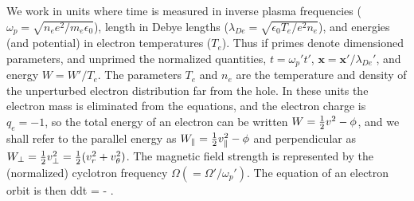 \documentclass{agujournal2019}
\let\oldequation\equation
\let\oldendequation\endequation
\renewenvironment{equation}
  {\linenomathNonumbers\oldequation}
  {\oldendequation\endlinenomath}
\begin{document}
We work in units where time is measured in inverse plasma frequencies
($\omega_p=\sqrt{n_ee^2/m_e\epsilon_0}$), length in Debye lengths
($\lambda_{De}=\sqrt{\epsilon_0T_e/e^2n_e}$), and energies (and
potential) in electron temperatures ($T_e$). Thus if primes denote
dimensioned parameters, and unprimed the normalized quantities,
$t=\omega_p't'$, $\bm{x}=\bm{x}'/\lambda_{De}'$, and energy
$W=W'/T_e$. The parameters $T_e$ and $n_e$ are the temperature and
density of the unperturbed electron distribution far from the hole.
In these units the electron mass is eliminated from the equations, and
the electron charge is $q_e=-1$, so the total energy of an electron
can be written $W={1\over2}v^2-\phi$, and we shall refer to the
parallel energy as $W_\parallel={1\over2}v_\parallel^2-\phi$ and
perpendicular as
$W_\perp = {1\over2}v_\perp^2={1\over2}(v_r^2+v_\theta^2)$. The
magnetic field strength is represented by the (normalized) cyclotron
frequency $\Omega(=\Omega'/\omega_p')$. The equation of an electron
orbit is then
\begin{equation}
  \label{eq:orbit}
  {d\over dt} = \bm\nabla \phi - \times\Omega{}.
\end{equation}
\end{document}
